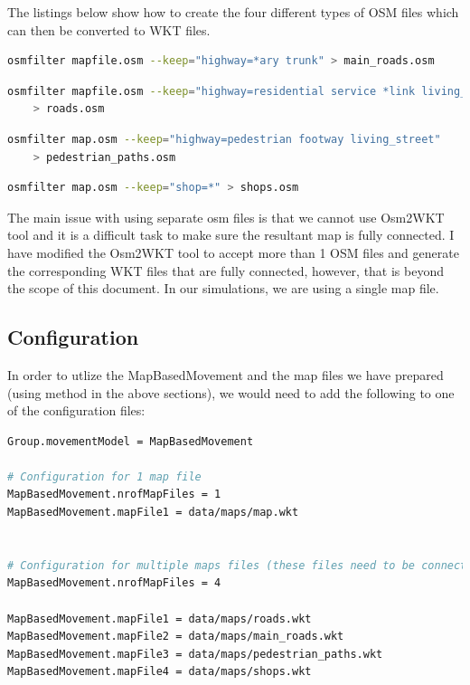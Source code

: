 The listings below show how to create the four different types of OSM files which can then be converted to WKT files.
\vspace{5mm}
\begin{lstlisting}[language=bash]
	osmfilter mapfile.osm --keep="highway=*ary trunk" > main_roads.osm
\end{lstlisting}
\vspace{5mm}
\begin{lstlisting}[language=bash]
	osmfilter mapfile.osm --keep="highway=residential service *link living_street"
	> roads.osm
\end{lstlisting}
\vspace{5mm}
\begin{lstlisting}[language=bash]
	osmfilter map.osm --keep="highway=pedestrian footway living_street"
	> pedestrian_paths.osm

\end{lstlisting}
\vspace{6mm}
\begin{lstlisting}[language=bash]
	osmfilter map.osm --keep="shop=*" > shops.osm
\end{lstlisting}
\vspace{5mm}

The main issue with using separate osm files is that we cannot use Osm2WKT tool \cite{mayer2010osm} and it is a difficult task to make sure the resultant map is fully connected. I have modified the Osm2WKT tool \cite{mayer2010osm} to accept more than 1 OSM files and generate the corresponding WKT files that are fully connected, however, that is beyond the scope of this document. In our simulations, we are using a single map file.

\subsection{Configuration}
In order to utlize the MapBasedMovement and the map files we have prepared (using method in the above sections), we would need to add the following to one of the configuration files:\newline

\begin{lstlisting}[language=bash]
Group.movementModel = MapBasedMovement

# Configuration for 1 map file
MapBasedMovement.nrofMapFiles = 1
MapBasedMovement.mapFile1 = data/maps/map.wkt


# Configuration for multiple maps files (these files need to be connected (when overlayed on each other))
MapBasedMovement.nrofMapFiles = 4

MapBasedMovement.mapFile1 = data/maps/roads.wkt
MapBasedMovement.mapFile2 = data/maps/main_roads.wkt
MapBasedMovement.mapFile3 = data/maps/pedestrian_paths.wkt
MapBasedMovement.mapFile4 = data/maps/shops.wkt

\end{lstlisting}
\newpage

